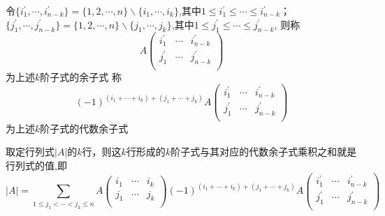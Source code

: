 \begin{definition}[（代数）余子式]
    令$\{ i_{1}^{'},\cdots, i_{n-k}^{'} \} = \{ 1,2,\cdots, n \} \backslash \{ i_1,\cdots, i_k \}$,其中$1 \leq i_{1}^{'} \leq \cdots \leq i_{n-k}^{'}$；
    $\{ j_{1}^{'},\cdots, j_{n-k}^{'} \} = \{ 1,2,\cdots, n \} \backslash \{ j_1,\cdots, j_k \}$,其中$1 \leq j_{1}^{'} \leq \cdots \leq j_{n-k}^{'}$,
    则称
    \begin{equation*}
        A
        \begin{pmatrix}
            i_{1}^{'} & \cdots & i_{n-k}^{'}\\
            j_{1}^{'} & \cdots & j_{n-k}^{'}\\
        \end{pmatrix}
    \end{equation*}
    为上述$k$阶子式的余子式
    称
    \begin{equation*}
        (-1)^{(i_1 + \cdots + i_k) + (j_1 + \cdots + j_k)}A
        \begin{pmatrix}
            i_{1}^{'} & \cdots & i_{n-k}^{'}\\
            j_{1}^{'} & \cdots & j_{n-k}^{'}\\
        \end{pmatrix}
    \end{equation*}
    为上述$k$阶子式的代数余子式
\end{definition}

\begin{theorem}[Laplace定理]
    取定行列式$|A|$的$k$行，则这$k$行形成的$k$阶子式与其对应的代数余子式乘积之和就是行列式的值,即
    \begin{equation*}
        |A| = \sum_{1 \leq j_1 < \cdots < j_k \leq n}^{}A
        \begin{pmatrix}
            i_{1} & \cdots & i_{k}\\
            j_{1} & \cdots & j_{k}\\
        \end{pmatrix}
        (-1)^{(i_1 + \cdots + i_k) + (j_1 + \cdots + j_k)}A
        \begin{pmatrix}
            i_{1}^{'} & \cdots & i_{n-k}^{'}\\
            j_{1}^{'} & \cdots & j_{n-k}^{'}\\
        \end{pmatrix}
    \end{equation*}
\end{theorem}

